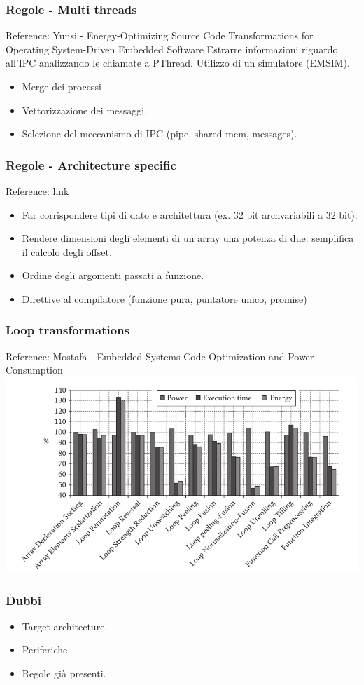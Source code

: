 \documentclass{beamer}
\begin{document}
\begin{frame}
\frametitle{Regole - Multi threads}
Reference: Yunsi - Energy-Optimizing Source Code Transformations for Operating System-Driven Embedded Software
\newline\newline
Estrarre informazioni riguardo all'IPC analizzando le chiamate a PThread. Utilizzo di un simulatore (EMSIM).\newline
\begin{itemize}
\item Merge dei processi
\item Vettorizzazione dei messaggi.
\item Selezione del meccanismo di IPC (pipe, shared mem, messages).
\end{itemize}

\end{frame}

\begin{frame}
\frametitle{Regole - Architecture specific}
Reference: \href{https://www.embedded.com/energy-efficient-c-code-for-arm-devices/}{link}
\begin{itemize}
\item Far corrispondere tipi di dato e architettura (ex. 32 bit arch\textrightarrow variabili a 32 bit).
\item Rendere dimensioni degli elementi di un array una potenza di due: semplifica il calcolo degli offset.
\item Ordine degli argomenti passati a funzione.
\item Direttive al compilatore (funzione pura, puntatore unico, promise)
\end{itemize}
\end{frame}

\begin{frame}
\frametitle{Loop transformations}
Reference: Mostafa - Embedded Systems Code Optimization and Power Consumption
\includegraphics[scale=0.4]{graph.png}
\end{frame}

\begin{frame}
\frametitle{Dubbi}
\begin{itemize}
\item Target architecture.
\item Periferiche.
\item Regole già presenti.
\end{itemize}
\end{frame}
\end{document}
